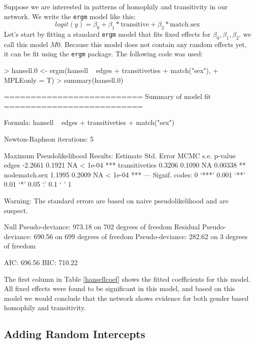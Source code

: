 \documentclass[a4paper]{article}
\begin{document}
Suppose we are interested in patterns of homophily and transitivity in our network. We write the \texttt{ergm} model like this:
$$
logit(y) = \beta_0 + \beta_1 * \mathrm{transitive} + \beta_2 * \mathrm{match.sex}
$$
Let's start by fitting a standard \texttt{ergm} model that fits fixed effects for $\beta_0, \beta_1, \beta_2$. we call this model $M0$. 
Because this model does not contain any random effects yet, it can be fit using the \texttt{ergm} package. The following code was used: 
\begin{Schunk}
\begin{Sinput}
> hansell.0 <- ergm(hansell ~ edges + transitiveties + match("sex"), 
+     MPLEonly = T)
> summary(hansell.0)
\end{Sinput}
\begin{Soutput}
==========================
Summary of model fit
==========================

Formula:   hansell ~ edges + transitiveties + match("sex")

Newton-Raphson iterations:  5 

Maximum Pseudolikelihood Results:
               Estimate Std. Error MCMC s.e. p-value    
edges           -2.2661     0.1921        NA < 1e-04 ***
transitiveties   0.3206     0.1090        NA 0.00338 ** 
nodematch.sex    1.1995     0.2009        NA < 1e-04 ***
---
Signif. codes:  0 ‘***’ 0.001 ‘**’ 0.01 ‘*’ 0.05 ‘.’ 0.1 ‘ ’ 1 

Warning:  The standard errors are based on naive pseudolikelihood and are suspect.

    Null  Pseudo-deviance: 973.18  on 702  degrees of freedom
 Residual Pseudo-deviance: 690.56  on 699  degrees of freedom
          Pseudo-deviance: 282.62  on   3  degrees of freedom
 
AIC: 696.56    BIC: 710.22 
\end{Soutput}
\end{Schunk}
The first column in Table \ref{hansellcoef} shows the fitted coefficients for this model. 
All fixed effects were found to be significant in this model, and based on this model we would conclude that the network shows evidence for both
gender based homophily and transitivity. \\  


\subsection{Adding Random Intercepts}
\end{document}
